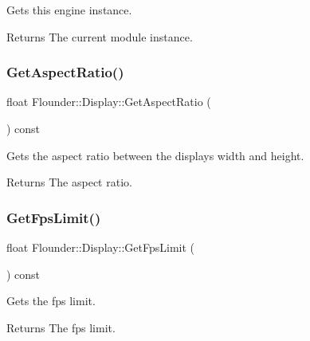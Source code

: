 Gets this engine instance. 

\begin{DoxyReturn}{Returns}
The current module instance. 
\end{DoxyReturn}
\mbox{\label{class_flounder_1_1_display_a57d9cb5bb1f6ffda1c0bd8c60c22b7ed}} 
\subsubsection{\texorpdfstring{Get\+Aspect\+Ratio()}{GetAspectRatio()}}
{\footnotesize\ttfamily float Flounder\+::\+Display\+::\+Get\+Aspect\+Ratio (\begin{DoxyParamCaption}{ }\end{DoxyParamCaption}) const\hspace{0.3cm}{\ttfamily [inline]}}



Gets the aspect ratio between the displays width and height. 

\begin{DoxyReturn}{Returns}
The aspect ratio. 
\end{DoxyReturn}
\mbox{\label{class_flounder_1_1_display_a29120d86c32475b76f9ecfc4039e0ed4}} 
\subsubsection{\texorpdfstring{Get\+Fps\+Limit()}{GetFpsLimit()}}
{\footnotesize\ttfamily float Flounder\+::\+Display\+::\+Get\+Fps\+Limit (\begin{DoxyParamCaption}{ }\end{DoxyParamCaption}) const\hspace{0.3cm}{\ttfamily [inline]}}



Gets the fps limit. 

\begin{DoxyReturn}{Returns}
The fps limit. 
\end{DoxyReturn}
\mbox{\label{class_flounder_1_1_display_a67c84743b162ec66eba181a463e36d4b}} 

